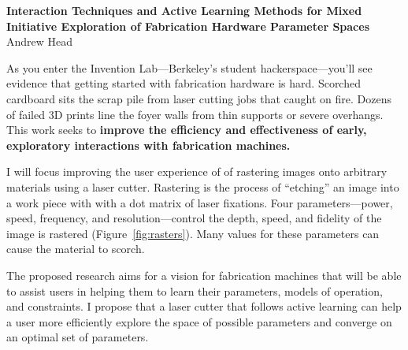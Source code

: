 \documentclass[12pt]{article}
\begin{document}

\begin{center}
  \textbf{Interaction Techniques and Active Learning Methods for Mixed Initiative Exploration of Fabrication Hardware Parameter Spaces}\\
  \vspace{.5em}
  Andrew Head
\end{center}

As you enter the Invention Lab---Berkeley's student hackerspace---you'll see evidence that getting started with fabrication hardware is hard.
Scorched cardboard sits the scrap pile from laser cutting jobs that caught on fire.
Dozens of failed 3D prints line the foyer walls from thin supports or severe overhangs.
This work seeks to \textbf{improve the efficiency and effectiveness of early, exploratory interactions with fabrication machines.}

I will focus improving the user experience of of rastering images onto arbitrary materials using a laser cutter.
Rastering is the process of ``etching'' an image into a work piece with with a dot matrix of laser fixations.
Four parameters---power, speed, frequency, and resolution---control the depth, speed, and fidelity of the image is rastered (Figure~\ref{fig:rasters}).
Many values for these parameters can cause the material to scorch.

The proposed research aims for a vision for fabrication machines that will be able to assist users in helping them to learn their parameters, models of operation, and constraints.
I propose that a laser cutter that follows active learning can help a user more efficiently explore the space of possible parameters and converge on an optimal set of parameters.

\end{document}
